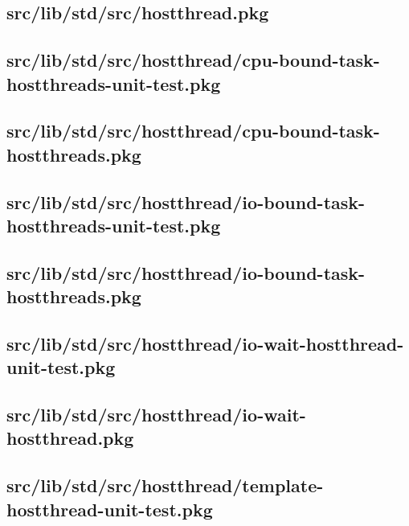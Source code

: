 \subsection{src/lib/std/src/hostthread.pkg}


\subsection{src/lib/std/src/hostthread/cpu-bound-task-hostthreads-unit-test.pkg}


\subsection{src/lib/std/src/hostthread/cpu-bound-task-hostthreads.pkg}


\subsection{src/lib/std/src/hostthread/io-bound-task-hostthreads-unit-test.pkg}


\subsection{src/lib/std/src/hostthread/io-bound-task-hostthreads.pkg}


\subsection{src/lib/std/src/hostthread/io-wait-hostthread-unit-test.pkg}


\subsection{src/lib/std/src/hostthread/io-wait-hostthread.pkg}


\subsection{src/lib/std/src/hostthread/template-hostthread-unit-test.pkg}


